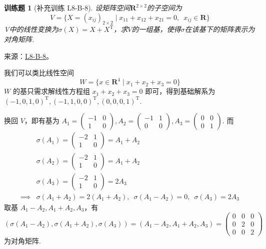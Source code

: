 \documentclass[UTF8,12pt,a4paper,fontset=fandol]{ctexart}
\newtheorem{exercise}{训练题}[section]
\begin{document}
\begin{exercise}[补充训练 L8-B-8]\label{prob:L8-B-8}
设矩阵空间$\mathbf{R}^{2\times 2}$的子空间为
        \[V=\{X=(x_{ij})_{2\times 2} \mid x_{11}+x_{12}+x_{21}=0,\enspace x_{ij}\in \mathbf{R}\}\]
        V中的线性变换为$\sigma(X)=X+X^\mathrm{T}$，求$V$的一组基，使得$\sigma$在该基下的矩阵表示为对角矩阵.
\end{exercise}
\noindent 来源：\href{https://github.com/yhwu-is/Linear-Algebra-Left-Undone/blob/new/%E8%AE%B2%E4%B9%89/%E4%B8%93%E9%A2%98/8%20%E7%9B%B8%E6%8A%B5%E6%A0%87%E5%87%86%E5%BD%A2.tex}{L8-B-8}。
\begin{solve}
我们可以类比线性空间
          \[ W = \{ x \in \mathbf{R}^4 \mid x_1 + x_2 + x_3 = 0 \} \]
          $ W $ 的基只需求解线性方程组 $ x_1 + x_2 + x_3 = 0 $ 即可，得到基础解系为 $ (-1, 0, 1, 0)^{\mathrm{T}},\allowbreak (-1, 1, 0, 0)^{\mathrm{T}},\allowbreak (0, 0, 0, 1)^{\mathrm{T}} $.

          换回 $ V $，即有基为 $ A_1 = \begin{pmatrix} -1 & 0 \\ 1 & 0 \end{pmatrix}, A_2 = \begin{pmatrix} -1 & 1 \\ 0 & 0 \end{pmatrix}, A_3 = \begin{pmatrix} 0 & 0 \\ 0 & 1 \end{pmatrix} $. 而
          \begin{align*}
                         & \sigma(A_1) = \begin{pmatrix} -2 & 1 \\ 1 & 0 \end{pmatrix} = A_1 + A_2                      \\
                         & \sigma(A_2) = \begin{pmatrix} -2 & 1 \\ 1 & 0 \end{pmatrix} = A_1 + A_2                      \\
                         & \sigma(A_3) = \begin{pmatrix} -2 & 1 \\ 1 & 0 \end{pmatrix} = 2 A_3                          \\
              \implies{} & \sigma(A_1 + A_2) = 2(A_1 + A_2),\enspace \sigma(A_1 - A_2) = 0,\enspace \sigma(A_3) = 2 A_3
          \end{align*}
          取基 $ A_1 - A_2, A_1 + A_2, A_3 $，有
          \[ (\sigma(A_1 - A_2), \sigma(A_1 + A_2), \sigma(A_3)) = (A_1 - A_2, A_1 + A_2, A_3) = \begin{pmatrix}
                  0 & 0 & 0 \\
                  0 & 2 & 0 \\
                  0 & 0 & 2
              \end{pmatrix} \]
          为对角矩阵.
\end{solve}
\end{document}
